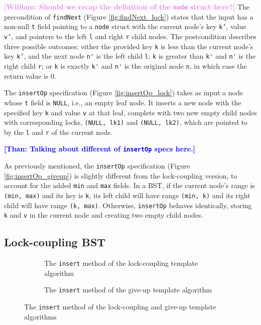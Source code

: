 \documentclass[a4paper,UKenglish,cleveref, autoref, thm-restate]{lipics-v2021}
\newcommand{\than}[1]{\textbf{\textcolor{blue}{[Than: #1]}}}
\newcommand{\wm}[1]{\textbf{\textcolor{violet}{[William: #1]}}}
\begin{document}
\wm{Should we recap the definition of the \lstinline{node} struct here?} The precondition of \texttt{findNext} (Figure \ref*{fig:findNext_lock}) states that the input has a non-null \texttt{t} field pointing to a \texttt{node} struct with the current node's key \texttt{k'}, value \texttt{v'}, and pointers to the left \texttt{l} and right \texttt{r} child nodes. The postcondition describes three possible outcomes: either the provided key \texttt{k} is less than the current node's key \texttt{k'}, and the next node \lstinline{n'} is the left child \lstinline{l}; \lstinline{k} is greater than \lstinline{k'} and \lstinline{n'} is the right child \lstinline{r}; or \lstinline{k} is exactly \lstinline{k'} and \lstinline{n'} is the original node \lstinline{n}, in which case the return value is 0.

The \texttt{insertOp} specification (Figure \ref{fig:insertOp_lock}) takes as input a node whose \lstinline{t} field is \lstinline{NULL}, i.e., an empty leaf node. It inserts a new node with the specified key \texttt{k} and value \texttt{v} at that leaf, complete with two new empty child nodes with corresponding locks, \texttt{(NULL, lk1)} and \texttt{(NULL, lk2)}, which are pointed to by the \texttt{l} and \texttt{r} of the current node.  

\than{Talking about different of \texttt{insertOp} specs here.}


As previously mentioned, the \texttt{insertOp} specification (Figure \ref{fig:insertOp_giveup}) is slightly different from the lock-coupling version, to account for the added \lstinline{min} and \lstinline{max} fields. In a BST, if the current node's range is \lstinline{(min, max)} and its key is \lstinline{k}, its left child will have range \texttt{(min, k)} and its right child will have range \texttt{(k, max)}. Otherwise, \lstinline{insertOp} behaves identically, storing \lstinline{k} and \lstinline{v} in the current node and creating two empty child nodes.


\subsection{Lock-coupling BST}
\label{BST_lock_insert}
\begin{figure}[h]
	\begin{subfigure}[t]{0.48\textwidth}
	 
	\caption{The \lstinline{insert} method of the lock-coupling template algorithm}
	\label{insert_lock}	
	\end{subfigure}\qquad
    \begin{subfigure}[t]{0.48\textwidth}
     
    \caption{The \lstinline{insert} method of the give-up template algorithm}
    \label{insert_giveup}
    \end{subfigure} 
\caption{The \lstinline{insert} method of the lock-coupling and give-up template algorithms}
\label{insert_lock_giveup} 
\end{figure}
\end{document}
